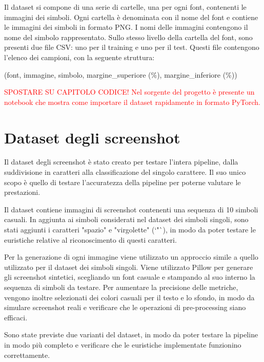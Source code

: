 Il dataset si compone di una serie di cartelle, una per ogni font, contenenti le immagini dei simboli. Ogni cartella è denominata con il nome del font e contiene le immagini dei simboli in formato PNG. I nomi delle immagini contengono il nome del simbolo rappresentato. Sullo stesso livello della cartella del font, sono presenti due file CSV: uno per il training e uno per il test. Questi file contengono l'elenco dei campioni, con la seguente struttura:
\begin{center}
(font, immagine, simbolo, margine\_superiore (\%), margine\_inferiore (\%))
\end{center}

\textcolor{red}{SPOSTARE SU CAPITOLO CODICE! Nel sorgente del progetto è presente un notebook che mostra come importare il dataset rapidamente in formato PyTorch.}

\section{Dataset degli screenshot}

Il dataset degli screenshot è stato creato per testare l'intera pipeline, dalla suddivisione in caratteri alla classificazione del singolo carattere. Il suo unico scopo è quello di testare l'accuratezza della pipeline per poterne valutare le prestazioni. 

Il dataset contiene immagini di screenshot contenenti una sequenza di 10 simboli casuali. In aggiunta ai simboli considerati nel dataset dei simboli singoli, sono stati aggiunti i caratteri "spazio" e "virgolette" (`"`), in modo da poter testare le euristiche relative al riconoscimento di questi caratteri.

Per la generazione di ogni immagine viene utilizzato un approccio simile a quello utilizzato per il dataset dei simboli singoli. Viene utilizzato Pillow per generare gli screenshot sintetici, scegliando un font casuale e stampando al suo interno la sequenza di simboli da testare.
Per aumentare la precisione delle metriche, vengono inoltre selezionati dei colori casuali per il testo e lo sfondo, in modo da simulare screenshot reali e verificare che le operazioni di pre-processing siano efficaci.

Sono state previste due varianti del dataset, in modo da poter testare la pipeline in modo più completo e verificare che le euristiche implementate funzionino correttamente.

